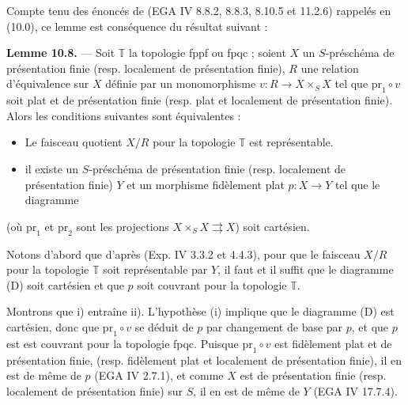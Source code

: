 \documentclass[11pt,a4paper]{article}
\begin{document}
Compte tenu des énoncés de (EGA IV 8.8.2, 8.8.3, 8.10.5 et 11.2.6)
rappelés en (10.0), ce lemme est conséquence du résultat suivant :

\textbf{Lemme 10.8.} — Soit $\mathbb{T}$ la topologie fppf ou fpqc ;
soient \struck{\ill{}} $X$ un $S$-préschéma de présentation finie (resp.
localement de présentation finie), $R$ une relation d'équivalence sur $X$
définie par un monomorphisme $v \colon R \to X \times_{S} X$ tel que
$\mathrm{pr}_{1} \circ v$ soit plat et de présentation finie (resp. plat
et localement de présentation finie). Alors les conditions suivantes sont
équivalentes :
\begin{itemize}
  \item[(i)] Le faisceau quotient $X/R$ pour la topologie $\mathbb{T}$ est
    représentable.
  \item[(ii)] il existe un $S$-préschéma de présentation finie (resp.
    localement de présentation finie) $Y$ et un morphisme fidèlement plat
    $p \colon X \to Y$ tel que le diagramme
\end{itemize}


(où $\mathrm{pr}_{1}$ et $\mathrm{pr}_{2}$ sont les projections
$X \times_{S} X \rightrightarrows X$) soit cartésien.

Notons d'abord que d'après (Exp. IV 3.3.2 et 4.4.3), pour que le faisceau
$X/R$ pour la topologie $\mathbb{T}$ soit représentable par $Y$, il faut
et il suffit que le diagramme (D) soit cartésien et que $p$ soit couvrant
pour la topologie $\mathbb{T}$.

Montrons que i) entraîne ii). L'hypothèse (i) implique que le diagramme
(D) est cartésien, donc que $\mathrm{pr}_{1} \circ v$ se déduit de $p$ par
changement de base par $p$, et que $p$ est
est couvrant pour la topologie fpqc. Puisque $\mathrm{pr}_{1} \circ v$ est
fidèlement plat et de présentation finie, (resp. fidèlement plat et
localement de présentation finie), il en est de même de $p$ (EGA IV
2.7.1), et comme $X$ est de présentation finie (resp. localement de
présentation finie) sur $S$, il en est de même de $Y$ (EGA IV 17.7.4).
\end{document}
